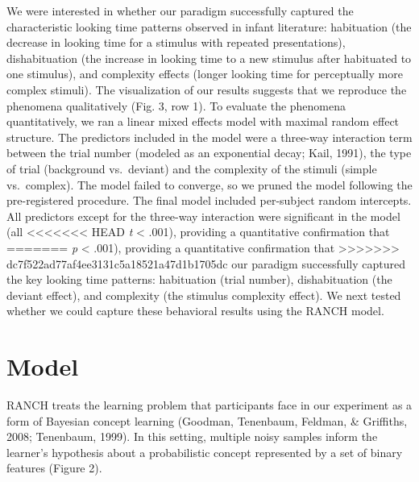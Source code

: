 \documentclass[10pt, letterpaper]{article}
\begin{document}
We were interested in whether our paradigm successfully captured the
characteristic looking time patterns observed in infant literature:
habituation (the decrease in looking time for a stimulus with repeated
presentations), dishabituation (the increase in looking time to a new
stimulus after habituated to one stimulus), and complexity effects
(longer looking time for perceptually more complex stimuli). The
visualization of our results suggests that we reproduce the phenomena
qualitatively (Fig. 3, row 1). To evaluate the phenomena quantitatively,
we ran a linear mixed effects model with maximal random effect
structure. The predictors included in the model were a three-way
interaction term between the trial number (modeled as an exponential
decay; Kail, 1991), the type of trial (background vs.~deviant) and the
complexity of the stimuli (simple vs.~complex). The model failed to
converge, so we pruned the model following the pre-registered procedure.
The final model included per-subject random intercepts. All predictors
except for the three-way interaction were significant in the model (all
<<<<<<< HEAD
\emph{t} \textless{} .001), providing a quantitative confirmation that
=======
\emph{p} \textless{} .001), providing a quantitative confirmation that
>>>>>>> dc7f522ad77af4ee3131c5a18521a47d1b1705dc
our paradigm successfully captured the key looking time patterns:
habituation (trial number), dishabituation (the deviant effect), and
complexity (the stimulus complexity effect). We next tested whether we
could capture these behavioral results using the RANCH model.

\hypertarget{model}{%
\section{Model}\label{model}}

RANCH treats the learning problem that participants face in our
experiment as a form of Bayesian concept learning (Goodman, Tenenbaum,
Feldman, \& Griffiths, 2008; Tenenbaum, 1999). In this setting, multiple
noisy samples inform the learner's hypothesis about a probabilistic
concept represented by a set of binary features (Figure 2).
\end{document}

